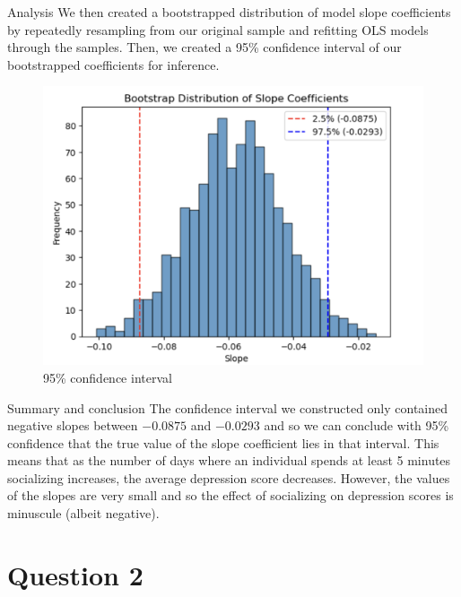\documentclass{beamer}
\begin{document}
\begin{frame}{Analysis}
    We then created a bootstrapped distribution of model slope coefficients by repeatedly resampling from our original sample and refitting OLS models through the samples. Then, we created a 95\% confidence interval of our bootstrapped coefficients for inference.
    \begin{figure}
        \centering
        \includegraphics[width=0.5\linewidth]{95CI.png}
        \caption{95\% confidence interval}
        \label{fig:enter-label}
    \end{figure}
\end{frame}

\begin{frame}{Summary and conclusion}
The confidence interval we constructed only contained negative slopes between $-0.0875$ and $-0.0293$ and so we can conclude with 95\% confidence that the true value of the slope coefficient lies in that interval. This means that as the number of days where an individual spends at least 5 minutes socializing increases, the average depression score decreases. However, the values of the slopes are very small and so the effect of socializing on depression scores is minuscule (albeit negative).
    
\end{frame}







\section{Question 2}
\end{document}
